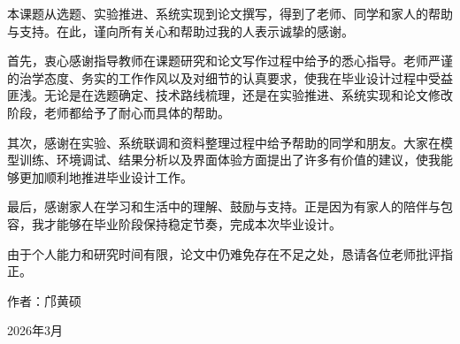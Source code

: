
\begin{acknowledgements}

本课题从选题、实验推进、系统实现到论文撰写，得到了老师、同学和家人的帮助与支持。在此，谨向所有关心和帮助过我的人表示诚挚的感谢。

首先，衷心感谢指导教师在课题研究和论文写作过程中给予的悉心指导。老师严谨的治学态度、务实的工作作风以及对细节的认真要求，使我在毕业设计过程中受益匪浅。无论是在选题确定、技术路线梳理，还是在实验推进、系统实现和论文修改阶段，老师都给予了耐心而具体的帮助。

其次，感谢在实验、系统联调和资料整理过程中给予帮助的同学和朋友。大家在模型训练、环境调试、结果分析以及界面体验方面提出了许多有价值的建议，使我能够更加顺利地推进毕业设计工作。

最后，感谢家人在学习和生活中的理解、鼓励与支持。正是因为有家人的陪伴与包容，我才能够在毕业阶段保持稳定节奏，完成本次毕业设计。

由于个人能力和研究时间有限，论文中仍难免存在不足之处，恳请各位老师批评指正。

\begin{flushright}
作者：邝黄硕

2026年3月
\end{flushright}

\end{acknowledgements}
